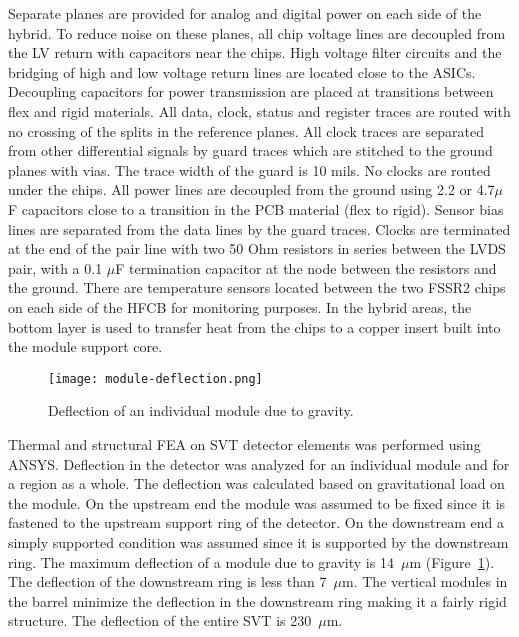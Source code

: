 Separate planes are provided for analog and digital power on each side of the hybrid. To reduce noise on these planes, all chip voltage lines are decoupled from the LV return with capacitors near the chips. High voltage filter circuits and the bridging of high and low voltage return lines are located close to the ASICs. Decoupling capacitors for power transmission are placed at transitions between flex and rigid materials. All data, clock, status and register traces are routed with no crossing of the splits in the reference planes. All clock traces are separated from other differential signals by guard traces which are stitched to the ground planes with vias. The trace width of the guard is 10 mils. No clocks are routed under the chips. All power lines are  decoupled from the ground using 2.2 or 4.7$\mu$F capacitors close to a transition in the PCB material (flex to rigid). Sensor bias lines are separated from the data lines by the guard traces. Clocks are terminated at the end of the pair line with two 50 Ohm resistors in series between the LVDS pair, with a 0.1 $\mu$F termination capacitor at the node between the resistors and the ground. There are temperature sensors located between the two FSSR2 chips on each side of the HFCB for monitoring purposes. In the hybrid areas, the bottom layer is used to transfer heat from the chips to a copper insert built into the module support core.

\begin{figure}[hbt] 
\centering 
\texttt{[image: module-deflection.png]}
\caption{Deflection of an individual module due to gravity.}
\label{fig:module-deflection}
\end{figure}

Thermal and structural FEA on SVT detector elements was performed using ANSYS. Deflection in the detector was analyzed for an individual module and for a region as a whole. The deflection was calculated based on gravitational load on the module. On the upstream end the module was assumed to be fixed since it is fastened to the upstream support ring of the detector. On the downstream end a simply supported condition was assumed since it is supported by the downstream ring. The maximum deflection of a module due to gravity is 14~$\mu$m (Figure~\ref{fig:module-deflection}). The deflection of the downstream ring is less than 7~$\mu$m. The vertical modules in the barrel minimize the deflection in the downstream ring making it a fairly rigid structure. The deflection of the entire SVT is 230~$\mu$m. 

